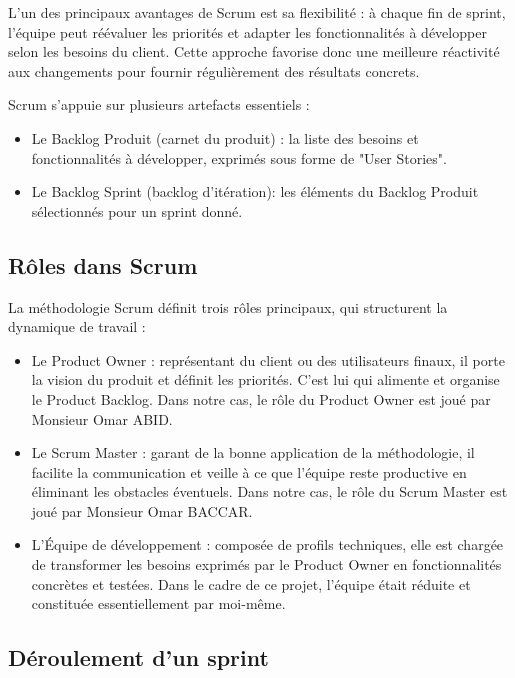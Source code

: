L’un des principaux avantages de Scrum est sa flexibilité : à chaque fin de sprint, l’équipe peut réévaluer les priorités et adapter les fonctionnalités à développer selon les besoins du client. Cette approche favorise donc une meilleure réactivité aux changements pour fournir régulièrement des résultats concrets.\par

Scrum s’appuie sur plusieurs artefacts essentiels :
\begin{itemize}[label=\textbullet]
    \item  Le Backlog Produit (carnet du produit) : la liste des besoins et fonctionnalités à développer, exprimés sous forme de "User Stories".
    \item Le Backlog Sprint (backlog d’itération): les éléments du Backlog Produit sélectionnés pour un sprint donné.
\end{itemize}

\subsection{Rôles dans Scrum}

La méthodologie Scrum définit trois rôles principaux, qui structurent la dynamique de travail :
\begin{itemize}[label=$\triangleright$]
    \item Le Product Owner : représentant du client ou des utilisateurs finaux, il porte la vision du produit et définit les priorités. C’est lui qui alimente et organise le Product Backlog. Dans notre cas, le rôle du Product Owner est joué par Monsieur Omar ABID.
    \item Le Scrum Master : garant de la bonne application de la méthodologie, il facilite la communication et veille à ce que l’équipe reste productive en éliminant les obstacles éventuels. Dans notre cas, le rôle du Scrum Master est joué par Monsieur Omar BACCAR.
    \item L’Équipe de développement : composée de profils techniques, elle est chargée de transformer les besoins exprimés par le Product Owner en fonctionnalités concrètes et testées. Dans le cadre de ce projet, l’équipe était réduite et constituée essentiellement par moi-même.
\end{itemize}

\subsection{Déroulement d’un sprint}

